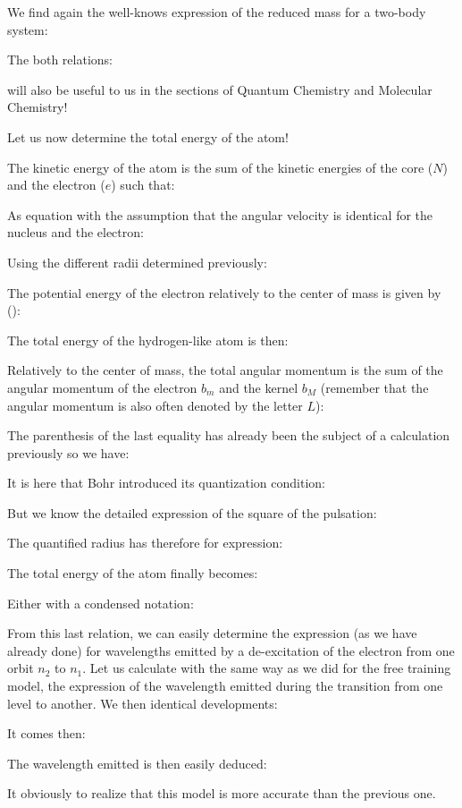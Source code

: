 	We find again the well-knows expression of the reduced mass for a two-body system:
	
	The both relations:
	
	will also be useful to us in the sections of Quantum Chemistry and Molecular Chemistry!
	
	Let us now determine the total energy of the atom!

	The kinetic energy of the atom is the sum of the kinetic energies of the core ($N$) and the electron ($e$) such that:
	
As equation with the assumption that the angular velocity is identical for the nucleus and the electron:
	
Using the different radii determined previously:
	
The potential energy of the electron relatively to the center of mass is given by ():
	
The total energy of the hydrogen-like atom is then:
	

Relatively to the center of mass, the total angular momentum is the sum of the angular momentum of the electron $b_m$ and the kernel $b_M$ (remember that the angular momentum is also often denoted by the letter $L$):
	
The parenthesis of the last equality has already been the subject of a calculation previously so we have:
	
It is here that Bohr introduced its quantization condition:
	
	But we know the detailed expression of the square of the pulsation:
	
	The  quantified radius has therefore for expression:
		
	The total energy of the atom finally becomes:
		
		Either with a condensed notation:
		
From this last relation, we can easily determine the expression (as we have already done) for wavelengths emitted by a de-excitation of the electron from one orbit $n_2$ to $n_1$. Let us calculate with the same way as we did for the free training model, the expression of the wavelength emitted during the transition from one level to another. We then identical developments:
		
It comes then:
		
The wavelength emitted is then easily deduced:
		

	\begin{tcolorbox}[title=Remark,colframe=black,arc=10pt]
It obviously to realize that this model is more accurate than the previous one.
	\end{tcolorbox}	
	
